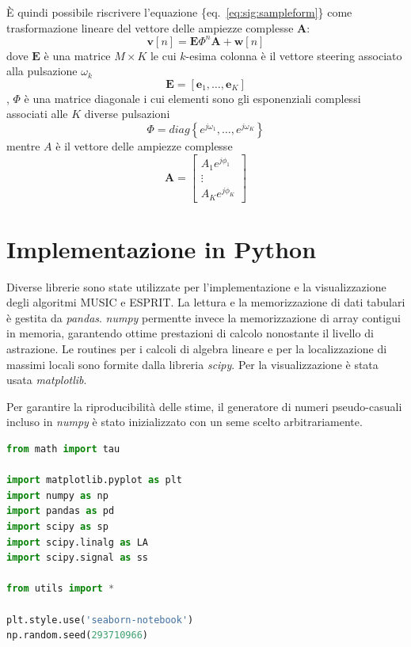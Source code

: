 \documentclass[
  italian,
]{article}
\begin{document}
È quindi possibile riscrivere l'equazione
\{eq.~\ref{eq:sig:sampleform}\} come trasformazione lineare del vettore
delle ampiezze complesse \(\mathbf{A}\): \[
\mathbf{v}[n] = \mathbf{E} \Phi^n \mathbf{A} + \mathbf{w}[n]
\] dove \(\mathbf{E}\) è una matrice \(M \times K\) le cui \(k\)-esima
colonna è il vettore steering associato alla pulsazione \(\omega_k\) \[
\mathbf{E} = \left[ \mathbf{e}_1, \ldots, \mathbf{e}_K \right]
\] , \(\Phi\) è una matrice diagonale i cui elementi sono gli
esponenziali complessi associati alle \(K\) diverse pulsazioni \[
\Phi = diag \left\{ e^{j \omega_1}, \ldots, e^{j \omega_K} \right\}
\] mentre \(A\) è il vettore delle ampiezze complesse \[
\mathbf{A} = \begin{bmatrix}
    A_1 e^{j \phi_1} \\
    \vdots \\
    A_K e^{j \phi_K}
\end{bmatrix}
\]

\hypertarget{implementazione-in-python}{%
\section{Implementazione in Python}\label{implementazione-in-python}}

Diverse librerie sono state utilizzate per l'implementazione e la
visualizzazione degli algoritmi MUSIC e ESPRIT. La lettura e la
memorizzazione di dati tabulari è gestita da \emph{pandas}. \emph{numpy}
permentte invece la memorizzazione di array contigui in memoria,
garantendo ottime prestazioni di calcolo nonostante il livello di
astrazione. Le routines per i calcoli di algebra lineare e per la
localizzazione di massimi locali sono formite dalla libreria
\emph{scipy}. Per la visualizzazione è stata usata \emph{matplotlib}.

Per garantire la riproducibilità delle stime, il generatore di numeri
pseudo-casuali incluso in \emph{numpy} è stato inizializzato con un seme
scelto arbitrariamente.

\begin{lstlisting}[language=Python]
from math import tau

import matplotlib.pyplot as plt
import numpy as np
import pandas as pd
import scipy as sp
import scipy.linalg as LA
import scipy.signal as ss

from utils import *

plt.style.use('seaborn-notebook')
np.random.seed(293710966)
\end{lstlisting}
\end{document}
